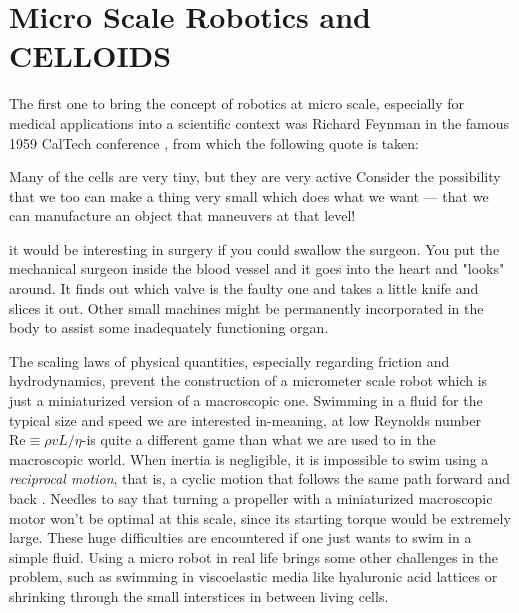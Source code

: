 \documentclass[../../master_thesis_np.tex]{subfiles}
\begin{document}
	\section{Micro Scale Robotics and CELLOIDS}
	The first one to bring the concept of robotics at micro scale, especially for medical applications into a scientific context was Richard Feynman in the famous 1959 CalTech conference , from which the following quote is taken:
	\begin{displayquote}
		Many of the cells are very tiny, but they are very active \omissis Consider the possibility that we too can make a thing very small which does what we want — that we can manufacture an object that maneuvers at that level!
		
		\omissis it would be interesting in surgery if you could swallow the surgeon. You put the mechanical surgeon inside the blood vessel and it goes into the heart and "looks" around. \omissis It finds out which valve is the faulty one and takes a little knife and slices it out. Other small machines might be permanently incorporated in the body to assist some inadequately functioning organ.\cite{Feynman}
	\end{displayquote}
	
	The scaling laws of physical quantities, especially regarding friction and hydrodynamics, prevent the construction of a micrometer scale robot which is just a miniaturized version of a macroscopic one. Swimming in a fluid for the typical size and speed we are interested in-meaning, at low Reynolds number $\mathrm{Re} \equiv \rho v L/\eta$-is quite a different game than what we are used to in the macroscopic world. When inertia is negligible, it is impossible to swim using a \emph{reciprocal motion}, that is, a cyclic motion that follows the same path forward and back \cite{purcell_life_1977}. Needles to say that turning a propeller with a miniaturized macroscopic motor won't be optimal at this scale, since its starting torque would be extremely large. These huge difficulties are encountered if one just wants to swim in a simple fluid. Using a micro robot in real life brings some other challenges in the problem, such as swimming in viscoelastic media like hyaluronic acid lattices or shrinking through the small interstices in between living cells.
	
\end{document}
